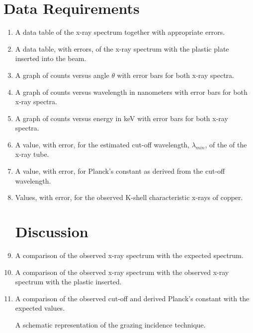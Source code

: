 \section{{\bf Data Requirements}}
\begin{enumerate}[resume]

\item A data table of the x-ray spectrum together with appropriate errors.

\item A data table, with errors, of the x-ray spectrum with the plastic plate inserted into the beam.

\item A graph of counts versus angle $\theta$ with error bars for both x-ray spectra.

\item A graph of counts versus wavelength in nanometers with error bars for both x-ray spectra.

\item A graph of counts versus energy in keV with error bars for both x-ray spectra.

\item A value, with error, for the estimated cut-off wavelength, $\lambda_{min}$, of the of the x-ray tube.

\item A value, with error, for Planck's constant as derived from the cut-off wavelength.

\item Values, with error, for the observed K-shell characteristic x-rays of copper.

\section{Discussion}

\item A comparison of the observed x-ray spectrum with the expected spectrum.

\item A comparison of the observed x-ray spectrum with the observed x-ray spectrum with the plastic inserted.

\item A comparison of the observed cut-off and derived Planck's constant with the expected values.

\begin{marginfigure}
\caption{A schematic representation of the grazing incidence technique.}
\label{fig:xr9}
\end{marginfigure}


\end{enumerate}
